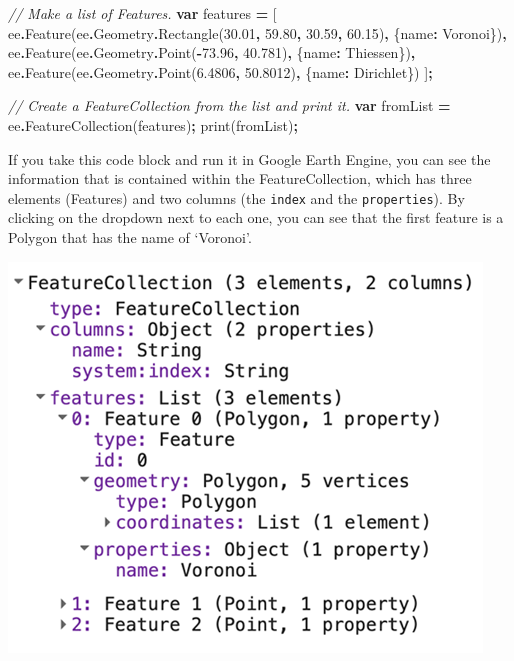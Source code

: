 \documentclass[
]{article}
\newenvironment{Shaded}{\begin{snugshade}}{\end{snugshade}}
\newcommand{\AttributeTok}[1]{\textcolor[rgb]{0.77,0.63,0.00}{#1}}
\newcommand{\CommentTok}[1]{\textcolor[rgb]{0.56,0.35,0.01}{\textit{#1}}}
\newcommand{\DataTypeTok}[1]{\textcolor[rgb]{0.13,0.29,0.53}{#1}}
\newcommand{\FloatTok}[1]{\textcolor[rgb]{0.00,0.00,0.81}{#1}}
\newcommand{\FunctionTok}[1]{\textcolor[rgb]{0.00,0.00,0.00}{#1}}
\newcommand{\KeywordTok}[1]{\textcolor[rgb]{0.13,0.29,0.53}{\textbf{#1}}}
\newcommand{\NormalTok}[1]{#1}
\newcommand{\OperatorTok}[1]{\textcolor[rgb]{0.81,0.36,0.00}{\textbf{#1}}}
\newcommand{\StringTok}[1]{\textcolor[rgb]{0.31,0.60,0.02}{#1}}
\begin{document}
\begin{Shaded}
\begin{Highlighting}[]
\CommentTok{// Make a list of Features.}
\KeywordTok{var}\NormalTok{ features }\OperatorTok{=}\NormalTok{ [}
\NormalTok{  ee}\OperatorTok{.}\FunctionTok{Feature}\NormalTok{(ee}\OperatorTok{.}\AttributeTok{Geometry}\OperatorTok{.}\FunctionTok{Rectangle}\NormalTok{(}\FloatTok{30.01}\OperatorTok{,} \FloatTok{59.80}\OperatorTok{,} \FloatTok{30.59}\OperatorTok{,} \FloatTok{60.15}\NormalTok{)}\OperatorTok{,}\NormalTok{ \{}\DataTypeTok{name}\OperatorTok{:} \StringTok{\textquotesingle{}Voronoi\textquotesingle{}}\NormalTok{\})}\OperatorTok{,}
\NormalTok{  ee}\OperatorTok{.}\FunctionTok{Feature}\NormalTok{(ee}\OperatorTok{.}\AttributeTok{Geometry}\OperatorTok{.}\FunctionTok{Point}\NormalTok{(}\OperatorTok{{-}}\FloatTok{73.96}\OperatorTok{,} \FloatTok{40.781}\NormalTok{)}\OperatorTok{,}\NormalTok{ \{}\DataTypeTok{name}\OperatorTok{:} \StringTok{\textquotesingle{}Thiessen\textquotesingle{}}\NormalTok{\})}\OperatorTok{,}
\NormalTok{  ee}\OperatorTok{.}\FunctionTok{Feature}\NormalTok{(ee}\OperatorTok{.}\AttributeTok{Geometry}\OperatorTok{.}\FunctionTok{Point}\NormalTok{(}\FloatTok{6.4806}\OperatorTok{,} \FloatTok{50.8012}\NormalTok{)}\OperatorTok{,}\NormalTok{ \{}\DataTypeTok{name}\OperatorTok{:} \StringTok{\textquotesingle{}Dirichlet\textquotesingle{}}\NormalTok{\})}
\NormalTok{]}\OperatorTok{;}

\CommentTok{// Create a FeatureCollection from the list and print it.}
\KeywordTok{var}\NormalTok{ fromList }\OperatorTok{=}\NormalTok{ ee}\OperatorTok{.}\FunctionTok{FeatureCollection}\NormalTok{(features)}\OperatorTok{;}
\FunctionTok{print}\NormalTok{(fromList)}\OperatorTok{;}
\end{Highlighting}
\end{Shaded}

If you take this code block and run it in Google Earth Engine, you can see the information that is contained within the FeatureCollection, which has three elements (Features) and two columns (the \texttt{index} and the \texttt{properties}). By clicking on the dropdown next to each one, you can see that the first feature is a Polygon that has the name of `Voronoi'.

\begin{center}\includegraphics[width=0.5\linewidth]{./im/im_01_02} \end{center}
\end{document}
